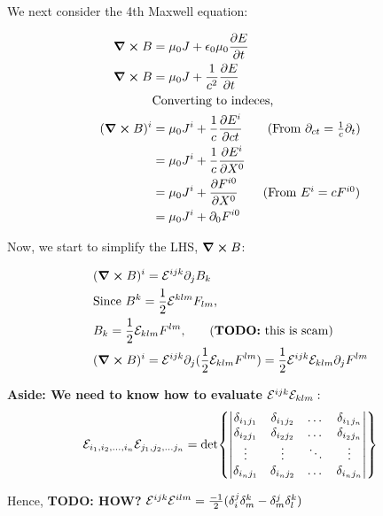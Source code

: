 We next consider the 4th Maxwell equation:

\begin{align*}
    \curl B &= \mu_0 J + \epsilon_0 \mu_0 \pdv{E}{t} \\
    \curl B &= \mu_0 J + \frac{1}{c^2} \pdv{E}{t} \\
            &\text{Converting to indeces,}\\
    (\curl B)^i &= \mu_0 J^i + \frac{1}{c} \pdv{E^i}{ct} \tag{From $\partial_{ct} = \frac{1}{c} \partial_t$} \\
                &= \mu_0 J^i + \frac{1}{c} \pdv{E^i}{X^0} \\
                &= \mu_0 J^i + \pdv{F^{i0}}{X^0} \tag{From $E^i = c F^{i0}$} \\
                &= \mu_0 J^i + \partial_0 F^{i0}
\end{align*}

Now, we start to simplify the LHS, $\curl B$:

\begin{align*}
    &(\curl B)^i = \levicevita^{ijk} \partial_j B_k \\
    &\text{Since $B^k = \frac{1}{2} \levicevita^{klm} F_{lm}$,} \\
    &\text{$B_k = \frac{1}{2} \levicevita_{klm} F^{lm}$,} \tag{\textbf{TODO:} this is scam} \\
    &(\curl B)^i = \levicevita^{ijk} \partial_j (\frac{1}{2} \levicevita_{klm} F^{lm}) =
    \frac{1}{2} \levicevita^{ijk} \levicevita_{klm} \partial_j F^{lm}\\
\end{align*}

\textbf{Aside: We need to know how to evaluate $\mathcal{E}^{ijk} \mathcal{E}_{klm}:$}
\begin{align*}
    \mathcal{E}_{i_1, i_2, \dots, i_n} \mathcal{E}_{j_1, j_2, \dots j_n} =  
    \det{
    \begin{vmatrix}
        \delta_{i_1 j_1} & \delta_{i_1 j_2} &\dots &\delta_{i_1 j_n} \\
        \delta_{i_2 j_1} &\delta_{i_2 j_2} &\dots &\delta_{i_2 j_n} \\
        \vdots           &\vdots  & \ddots & \vdots \\
        \delta_{i_n j_1} & \delta_{i_n j_2} & \dots & \delta_{i_n j_n}
\end{vmatrix}}
\end{align*}

Hence, \textbf{TODO: HOW?}
$\mathcal{E}^{ijk} \mathcal{E}^{ilm} = \frac{-1}{2} (\delta^j_i \delta^k_m - \delta^j_m \delta^k_l)$


